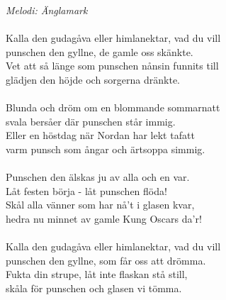 {\footnotesize\textit{Melodi: Änglamark}}\\
\\
Kalla den gudagåva eller himlanektar, vad du vill\\
punschen den gyllne, de gamle oss skänkte.\\
Vet att så länge som punschen nånsin funnits till\\
glädjen den höjde och sorgerna dränkte.\\
\\
Blunda och dröm om en blommande sommarnatt\\
svala bersåer där punschen står immig.\\
Eller en höstdag när Nordan har lekt tafatt\\
varm punsch som ångar och ärtsoppa simmig.\\
\\
Punschen den älskas ju av alla och en var.\\
Låt festen börja - låt punschen flöda!\\
Skål alla vänner som har nå't i glasen kvar,\\
hedra nu minnet av gamle Kung Oscars da'r!\\
\\
Kalla den gudagåva eller himlanektar, vad du vill\\
punschen den gyllne, som får oss att drömma.\\
Fukta din strupe, låt inte flaskan stå still,\\
skåla för punschen och glasen vi tömma.
